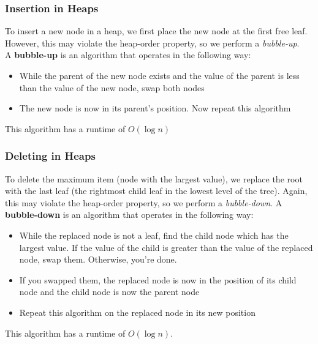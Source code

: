 \documentclass{report}
\begin{document}
\subsubsection{Insertion in Heaps}
To insert a new node in a heap, we first place the new node at the first free leaf. However, this may violate the heap-order property, so we perform a \textit{bubble-up}.\\
A \textbf{bubble-up} is an algorithm that operates in the following way:
\begin{itemize}
\item While the parent of the new node exists and the value of the parent is less than the value of the new node, swap both nodes
\item The new node is now in its parent's position. Now repeat this algorithm
\end{itemize}
This algorithm has a runtime of $O(\log n)$\newpage
\subsubsection{Deleting in Heaps}
To delete the maximum item (node with the largest value), we replace the root with the last leaf (the rightmost child leaf in the lowest level of the tree). Again, this may violate the heap-order property, so we perform a \textit{bubble-down}.
A \textbf{bubble-down} is an algorithm that operates in the following way:
\begin{itemize}
\item While the replaced node is not a leaf, find the child node which has the largest value. If the value of the child is greater than the value of the replaced node, swap them. Otherwise, you're done.
\item If you swapped them, the replaced node is now in the position of its child node and the child node is now the parent node
\item Repeat this algorithm on the replaced node in its new position
\end{itemize}
This algorithm has a runtime of $O(\log n)$.
\end{document}
